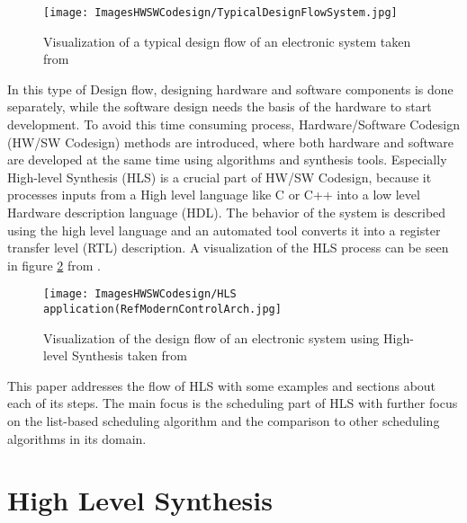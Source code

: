 \documentclass[conference]{IEEEtran}
\begin{document}
\begin{figure}[htbp]
    \centering
    \texttt{[image: ImagesHWSWCodesign/TypicalDesignFlowSystem.jpg]}
    \caption{Visualization of a typical design flow of an electronic system taken from \cite{HandbookHWSWCodesign}}
    \label{fig:OldSystemDesignFlow}
\end{figure}

In this type of Design flow, designing hardware and software components is done separately, while the software design needs the basis of the hardware to start development\cite{HandbookHWSWCodesign}. To avoid this time consuming process, Hardware/Software Codesign (HW/SW Codesign) methods are introduced, where both hardware and software are developed at the same time using algorithms and synthesis tools\cite{HandbookHWSWCodesign}. Especially High-level Synthesis (HLS) is a crucial part of HW/SW Codesign, because it processes inputs from a High level language like C or C++ into a low level Hardware description language (HDL)\cite{ModernControlArchitectures}. The behavior of the system is described using the high level language and an automated tool converts it into a register transfer level (RTL) description\cite{ModernControlArchitectures}. A visualization of the HLS process can be seen in figure \ref{fig:HLSDesignFLow} from \cite{ModernControlArchitectures}.

\begin{figure}[htbp]
    \centering
    \texttt{[image: ImagesHWSWCodesign/HLS application(RefModernControlArch.jpg]}
    \caption{Visualization of the design flow of an electronic system using High-level Synthesis taken from \cite{ModernControlArchitectures}}
    \label{fig:HLSDesignFLow}
\end{figure}

This paper addresses the flow of HLS with some examples and sections about each of its steps. The main focus is the scheduling part of HLS with further focus on the list-based scheduling algorithm and the comparison to other scheduling algorithms in its domain.

\section{High Level Synthesis}
\end{document}

